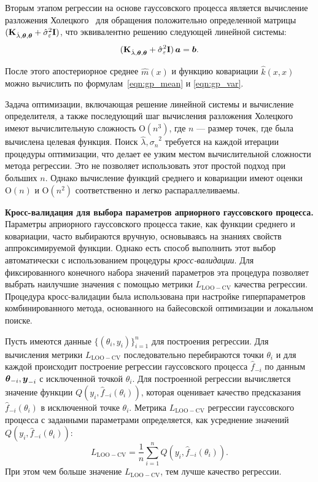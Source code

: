 Вторым этапом регрессии на основе гауссовского процесса является вычисление разложения Холецкого~\cite{benoit1924note} для обращения положительно определенной матрицы
$(\m{K}_{\hat{\lambda}, \v{\theta},\v{\theta}} + \hat{\sigma}_{\varepsilon}^{2}\m{I})$, что эквивалентно решению следующей линейной системы:
\begin{equation}
(\m{K}_{\hat{\lambda}, \v{\theta},\v{\theta}} + \hat{\sigma}_{\varepsilon}^{2}\m{I}) \, \v{a} = \v{b}.
\end{equation}

После этого апостериорное среднее $\hat{m}(x)$ и функцию ковариации $\hat{k}(x, x)$ можно вычислить по формулам~\ref{eqn:gp_mean} и \ref{eqn:gp_var}.

Задача оптимизации, включающая решение линейной системы и вычисление определителя, а также последующий шаг вычисления разложения Холецкого имеют вычислительную сложность $\mathrm{O}(n^3)$, где $n$ --- размер точек, где была вычислена целевая функция.
Поиск $\hat{\lambda}, \hat{\sigma_n}^2$ требуется на каждой итерации процедуры оптимизации, что делает ее узким местом вычислительной сложности метода регрессии.
Это не позволяет использовать этот простой подход при больших $n$.
Однако вычисление функций среднего и ковариации имеют оценки $\mathrm{O}(n)$ и $\mathrm{O}(n^2)$ соответственно и легко распараллеливаемы.


\textbf{Кросс-валидация для выбора параметров априорного гауссовского процесса.} %
Параметры априорного гауссовского процесса такие, как функции среднего и ковариации, часто выбираются вручную, основываясь на знаниях свойств аппроксимируемой функции.
Однако есть способ выполнить этот выбор автоматически с использованием процедуры \emph{кросс-валидации}.
Для фиксированного конечного набора значений параметров эта процедура позволяет выбрать наилучшие значения с помощью метрики $L_{\mathrm{LOO-CV}}$ качества регрессии.
Процедура кросс-валидации была использована при настройке гиперпараметров комбинированного метода, основанного на байесовской оптимизации и локальном поиске. 

Пусть имеются данные $\{(\theta_i, y_i)\}_{i=1}^n$ для построения регрессии.
Для вычисления метрики $L_{\mathrm{LOO-CV}}$ последовательно перебираются точки $\theta_i$ и для каждой происходит построение регрессии гауссовского процесса $\hat{f}_{-i}$ по данным $\v{\theta}_{-i}, \v{y}_{-i}$ с исключенной точкой $\theta_i$.
Для построенной регрессии вычисляется значение функции $Q(y_i, \hat{f}_{-i}(\theta_i))$, которая оценивает качество предсказания $\hat{f}_{-i}(\theta_i)$ в исключенной точке $\theta_i$.
Метрика $L_{\mathrm{LOO-CV}}$ регрессии гауссовского процесса с заданными параметрами определяется, как усреднение значений $Q(y_i, \hat{f}_{-i}(\theta_i))$:
\[
L_{\mathrm{LOO-CV}}
=
\frac{1}{n}
\sum_{i=1}^n
Q(y_i, \hat{f}_{-i}(\theta_i)).
\]
При этом чем больше значение $L_{\mathrm{LOO-CV}}$, тем лучше качество регрессии.

